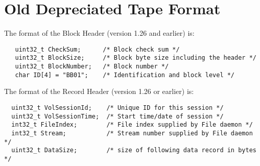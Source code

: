 \section{Old Depreciated Tape Format}

The format of the Block Header (version 1.26 and earlier) is:

\footnotesize
\begin{verbatim}
   uint32_t CheckSum;      /* Block check sum */
   uint32_t BlockSize;     /* Block byte size including the header */
   uint32_t BlockNumber;   /* Block number */
   char ID[4] = "BB01";    /* Identification and block level */
\end{verbatim}
\normalsize

The format of the Record Header (version 1.26 or earlier) is:

\footnotesize
\begin{verbatim}
  uint32_t VolSessionId;    /* Unique ID for this session */
  uint32_t VolSessionTime;  /* Start time/date of session */
  int32_t FileIndex;        /* File index supplied by File daemon */
  int32_t Stream;           /* Stream number supplied by File daemon */
  uint32_t DataSize;        /* size of following data record in bytes */
\end{verbatim}
\normalsize

